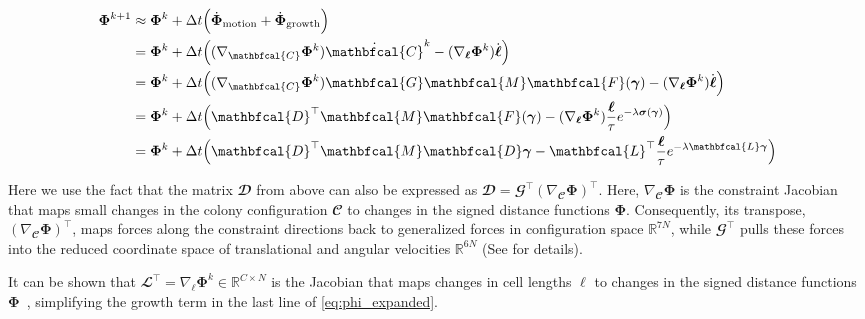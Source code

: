 \documentclass[conference]{IEEEtran}
\begin{document}
\begin{equation}\label{eq:phi_expanded}
    \small
    \begin{split}
        \mathbf{\Phi}^{k+1} & \approx \mathbf{\Phi}^k + \Delta t \Bigl( \dot{\mathbf{\Phi}}_{\text{motion}} + \dot{\mathbf{\Phi}}_{\text{growth}} \Bigr)\\
        & = \mathbf{\Phi}^k + \Delta t \Bigl( (\nabla_{\mathbfcal{C}} \mathbf{\Phi}^k) \dot{\mathbfcal{C}}^k - (\nabla_{\boldsymbol{\ell}} \mathbf{\Phi}^k) \dot{\boldsymbol{\ell}} \Bigr)\\
        & = \mathbf{\Phi}^k + \Delta t \Bigl( (\nabla_{\mathbfcal{C}} \mathbf{\Phi}^k) \mathbfcal{G} \mathbfcal{M}  \mathbfcal{F}(\boldsymbol{\gamma}) - (\nabla_{\boldsymbol{\ell}} \mathbf{\Phi}^k) \dot{\boldsymbol{\ell}} \Bigr)\\
        & = \mathbf{\Phi}^k + \Delta t \Bigl( \mathbfcal{D}^\top \mathbfcal{M}  \mathbfcal{F}(\boldsymbol{\gamma}) - (\nabla_{\boldsymbol{\ell}} \mathbf{\Phi}^k) \frac{\boldsymbol{\ell}}{\tau} e^{-\lambda  \boldsymbol{\sigma}(\boldsymbol{\gamma})} \Bigr)\\
        & = \mathbf{\Phi}^k + \Delta t \Bigl( \mathbfcal{D}^\top \mathbfcal{M} \mathbfcal{D} \boldsymbol{\gamma} - \mathbfcal{L}^\top \frac{\boldsymbol{\ell}}{\tau} e^{-\lambda \mathbfcal{L} \boldsymbol{\gamma}} \Bigr)
    \end{split}
\end{equation}


Here we use the fact that the matrix $\mathbfcal{D}$ from above can also be expressed as $\mathbfcal{D} = \mathbfcal{G}^\top (\nabla_{\mathbfcal{C}} \mathbf{\Phi})^\top$. Here, $\nabla_{\mathbfcal{C}} \mathbf{\Phi}$ is the constraint Jacobian that maps small changes in the colony configuration $\mathbfcal{C}$ to changes in the signed distance functions $\mathbf{\Phi}$. Consequently, its transpose, $(\nabla_{\mathbfcal{C}} \mathbf{\Phi})^\top$, maps forces along the constraint directions back to generalized forces in configuration space $\mathbb{R}^{7N}$, while $\mathbfcal{G}^\top$ pulls these forces into the reduced coordinate space of translational and angular velocities $\mathbb{R}^{6N}$ (See \cite{Weady2024, Tasora2008} for details).

It can be shown that $\mathbfcal{L}^\top = \nabla_{\boldsymbol{\ell}} \mathbf{\Phi}^k \in \mathbb{R}^{C \times N}$ is the Jacobian that maps changes in cell lengths $\boldsymbol{\ell}$ to changes in the signed distance functions $\mathbf{\Phi}$~\cite{Weady2024}, simplifying the growth term in the last line of \autoref{eq:phi_expanded}.
\end{document}
